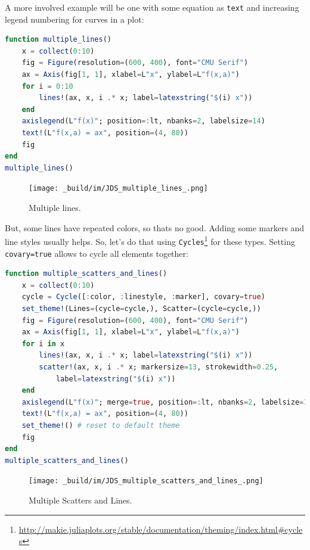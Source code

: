 \documentclass[
  notoc %
]{tufte-book}
\DeclareRobustCommand{\href}[2]{#2\footnote{\url{#1}}}
\newcommand{\passthrough}[1]{#1}
\begin{document}
A more involved example will be one with some equation as
\passthrough{\lstinline!text!} and increasing legend numbering for
curves in a plot:

\begin{lstlisting}[language=Julia]
function multiple_lines()
    x = collect(0:10)
    fig = Figure(resolution=(600, 400), font="CMU Serif")
    ax = Axis(fig[1, 1], xlabel=L"x", ylabel=L"f(x,a)")
    for i = 0:10
        lines!(ax, x, i .* x; label=latexstring("$(i) x"))
    end
    axislegend(L"f(x)"; position=:lt, nbanks=2, labelsize=14)
    text!(L"f(x,a) = ax", position=(4, 80))
    fig
end
multiple_lines()
\end{lstlisting}

\begin{figure}
\hypertarget{fig:multiple_lines}{%
\centering
\texttt{[image: \_build/im/JDS\_multiple\_lines\_.png]}
\caption{Multiple lines.}\label{fig:multiple_lines}
}
\end{figure}

But, some lines have repeated colors, so thats no good. Adding some
markers and line styles usually helps. So, let's do that using
\href{http://makie.juliaplots.org/stable/documentation/theming/index.html\#cycles}{\passthrough{\lstinline!Cycles!}}
for these types. Setting \passthrough{\lstinline!covary=true!} allows to
cycle all elements together:

\begin{lstlisting}[language=Julia]
function multiple_scatters_and_lines()
    x = collect(0:10)
    cycle = Cycle([:color, :linestyle, :marker], covary=true)
    set_theme!(Lines=(cycle=cycle,), Scatter=(cycle=cycle,))
    fig = Figure(resolution=(600, 400), font="CMU Serif")
    ax = Axis(fig[1, 1], xlabel=L"x", ylabel=L"f(x,a)")
    for i in x
        lines!(ax, x, i .* x; label=latexstring("$(i) x"))
        scatter!(ax, x, i .* x; markersize=13, strokewidth=0.25,
            label=latexstring("$(i) x"))
    end
    axislegend(L"f(x)"; merge=true, position=:lt, nbanks=2, labelsize=14)
    text!(L"f(x,a) = ax", position=(4, 80))
    set_theme!() # reset to default theme
    fig
end
multiple_scatters_and_lines()
\end{lstlisting}

\begin{figure}
\hypertarget{fig:multiple_scatters_and_lines}{%
\centering
\texttt{[image: \_build/im/JDS\_multiple\_scatters\_and\_lines\_.png]}
\caption{Multiple Scatters and
Lines.}\label{fig:multiple_scatters_and_lines}
}
\end{figure}
\end{document}
